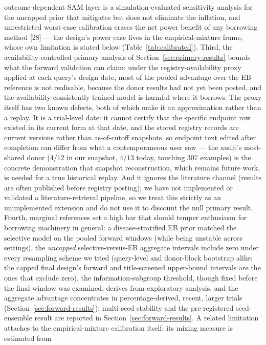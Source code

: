 \documentclass[11pt]{article}
\begin{document}
outcome-dependent SAM layer is a simulation-evaluated sensitivity analysis
for the uncapped prior that mitigates but does not eliminate the inflation,
and unrestricted worst-case calibration erases the net power benefit of any
borrowing method [28] --- the design's power case lives in the
empirical-mixture frame, whose own limitation is stated below
(Table~\ref{tab:calibrated}). Third, the availability-controlled primary
analysis of
Section~\ref{sec:primary-results} bounds what the forward validation can
claim: under the registry-availability proxy applied at each query's design
date, most
of the pooled advantage over the EB reference is not realisable, because the
donor results had not yet been posted, and the availability-consistently
trained model is harmful where it borrows. The proxy itself has two known
defects, both of which make it an approximation rather than a replay. It is
a trial-level date: it cannot certify that the specific endpoint row existed
in its current form at that date, and the stored registry records are
current versions rather than as-of-cutoff snapshots, so endpoint text edited
after completion can differ from what a contemporaneous user saw --- the
audit's most-shared donor ($4/12$ in our snapshot, $4/13$ today, touching
$307$ examples) is the concrete demonstration that snapshot reconstruction,
which remains future work, is needed for a true historical replay. And it
ignores the literature channel (results are often published before registry
posting); we have not implemented or validated a literature-retrieval
pipeline, so we treat this strictly as an unimplemented extension and do not
use it to discount the null primary result. Fourth, marginal
references set a high bar that should temper enthusiasm for borrowing
machinery in general: a disease-stratified EB prior matched the selective
model on the pooled forward windows (while being unstable across settings),
the \emph{uncapped} selective-versus-EB aggregate intervals include zero
under every resampling scheme we tried (query-level and donor-block
bootstrap alike; the capped final design's forward and title-screened
upper-bound intervals are the ones that exclude zero),
the information-subgroup threshold, though fixed before the final window was
examined, derives from exploratory analysis, and the aggregate advantage
concentrates in percentage-derived, recent, larger trials
(Section~\ref{sec:forward-results}); multi-seed stability and the
pre-registered seed-ensemble result are reported in
Section~\ref{sec:forward-results}. A related limitation attaches to the
empirical-mixture calibration itself: its mixing measure is estimated from
\end{document}
